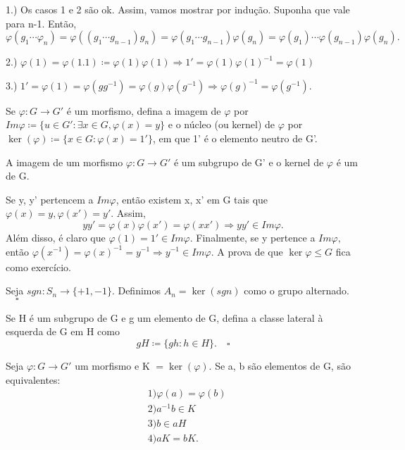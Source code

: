\documentclass[Algebra/algebra_notes.tex]{subfiles}
\begin{document}
\begin{proof*}
	1.) Os casos 1 e 2 são ok. Assim, vamos mostrar por indução. Suponha que vale para
	n-1. Então,
	$$
		\varphi(g_{1}\cdots\varphi_{n})=\varphi((g_{1}\cdots g_{n-1})g_{n}) = \varphi(g_{1}\cdots g_{n-1})\varphi(g_{n}) = \varphi(g_{1})\cdots\varphi(g_{n-1})\varphi(g_{n}).
	$$

	2.) $\varphi(1) = \varphi(1.1)\coloneqq \varphi(1)\varphi(1) \Rightarrow 1' = \varphi(1)\varphi(1)^{-1} = \varphi(1)$

	3.) $1' = \varphi(1) = \varphi(gg^{-1}) = \varphi(g)\varphi(g^{-1}) \Rightarrow \varphi(g)^{-1} = \varphi(g^{-1}).$ \qedsymbol
\end{proof*}
\begin{def*}
	Se $\varphi:G\rightarrow G'$ é um morfismo, defina a imagem de $\varphi$ por $Im \varphi\coloneqq\{u\in G': \exists x\in G, \varphi(x)=y\}$
	e o núcleo (ou kernel) de $\varphi$ por $\ker{(\varphi)}\coloneqq\{x\in G: \varphi(x) = 1'\} $, em que 1' é o elemento neutro de G'.
\end{def*}
\begin{prop*}
	A imagem de um morfismo $\varphi:G\rightarrow G'$ é um subgrupo de G' e o kernel de $\varphi$ é um de G.
\end{prop*}
\begin{proof*}
	Se y, y' pertencem a $Im\varphi$, então existem x, x' em G tais que $\varphi(x) = y, \varphi(x')=y'.$ Assim,
	$$
		yy' = \varphi(x)\varphi(x') = \varphi(xx') \Rightarrow yy'\in Im\varphi.
	$$
	Além disso, é claro que $\varphi(1) = 1'\in Im\varphi.$ Finalmente, se y pertence a $Im \varphi,$ então
	$\varphi(x^{-1}) = \varphi(x)^{-1} = y^{-1} \Rightarrow y^{-1}\in Im \varphi.$ A prova de que $\ker\varphi\leq{G}$ fica como
	exercício. \qedsymbol
\end{proof*}
\begin{def*}
	Seja $sgn:S_{n}\rightarrow \{+1, -1\}$. Definimos $A_{n} = \ker{(sgn)}$ como o grupo alternado. $\quad\square$
\end{def*}
\begin{def*}
	Se H é um subgrupo de G e g um elemento de G, defina a classe lateral \`a esquerda de G em H como
	$$
		gH\coloneqq \{gh: h\in H\}.\quad\square
	$$
\end{def*}
\begin{prop*}
	Seja $\varphi:G\rightarrow G'$ um morfismo e K $= \ker{(\varphi)}.$ Se a, b são elementos de G, são equivalentes:
	\begin{align*}
		 & 1) \varphi(a) = \varphi(b) \\
		 & 2) a^{-1}b\in K            \\
		 & 3) b\in aH                 \\
		 & 4) aK = bK.
	\end{align*}
\end{prop*}
\end{document}
